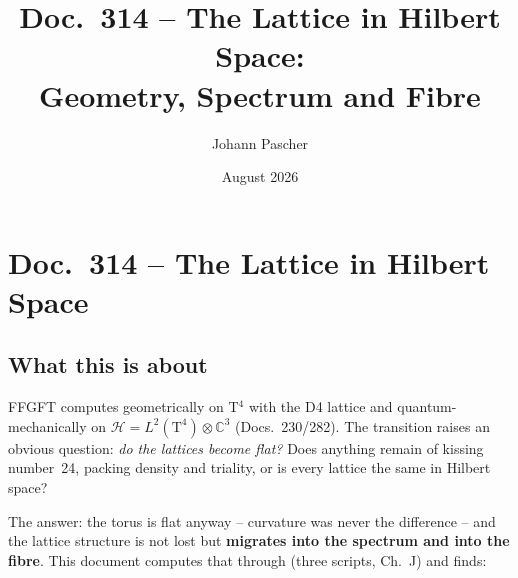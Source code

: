 \documentclass[11pt]{report}
\title{Doc.~314 -- The Lattice in Hilbert Space:\\
Geometry, Spectrum and Fibre}
\author{Johann Pascher}
\date{August 2026}
\begin{document}
\maketitle
\tableofcontents

\chapter*{Doc.~314 -- The Lattice in Hilbert Space}

\section*{What this is about}

FFGFT computes geometrically on T$^4$ with the D4 lattice and
quantum-mechanically on $\mathcal{H} = L^2(\text{T}^4)\otimes
\mathbb{C}^3$ (Docs.~230/282). The transition raises an obvious
question: \emph{do the lattices become flat?} Does anything remain of
kissing number~24, packing density and triality, or is every lattice
the same in Hilbert space?

The answer: the torus is flat anyway -- curvature was never the
difference -- and the lattice structure is not lost but
\textbf{migrates into the spectrum and into the fibre}. This document
computes that through (three scripts, Ch.~J) and finds:
\end{document}
